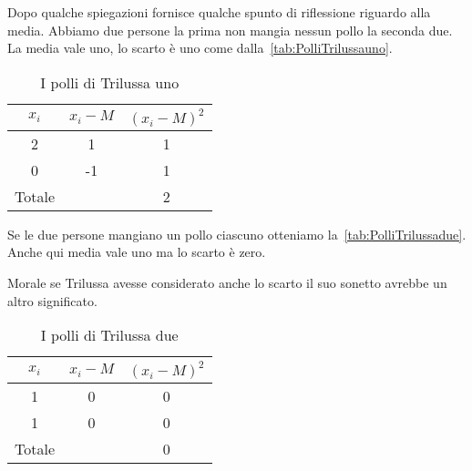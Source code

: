 Dopo qualche spiegazioni fornisce qualche spunto di riflessione riguardo alla media. Abbiamo due persone la prima non mangia nessun pollo la seconda due. La media vale uno, lo scarto è uno come dalla~\vref{tab:PolliTrilussauno}.\par 
\begin{table}
	\centering
	\begin{tabular}{S[table-format=1.0]S[table-format=2.0]S[table-format=1.2] }
		\toprule
		{$x_i$}	  & {$x_i-M$} & {$(x_i-M )^2$}  \\
			 & 1  & 1   \\ 
		0	 & -1 & 1   \\ 
		\midrule 
		{Totale}& & 2    \\
		\bottomrule 
	\end{tabular} 
	\caption{I polli di Trilussa uno}
	\label{tab:PolliTrilussauno}
\end{table}
Se le due persone mangiano un pollo ciascuno otteniamo la~\vref{tab:PolliTrilussadue}. Anche qui media vale uno ma lo scarto è zero.\par  Morale se Trilussa avesse considerato anche lo scarto il suo sonetto avrebbe un altro significato.
\begin{table}
	\centering
	\begin{tabular}{S[table-format=1.0]S[table-format=2.0]S[table-format=1.2] }
		\toprule
		{$x_i$}	  & {$x_i-M$} & {$(x_i-M )^2$}  \\
			 & 0  & 0   \\ 
		1	 & 0 & 0   \\ 
		\midrule 
		{Totale}& & 0    \\
		\bottomrule 
	\end{tabular} 
	\caption{I polli di Trilussa due}
	\label{tab:PolliTrilussadue}
\end{table}
